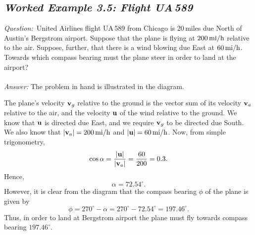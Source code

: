 \subsection*{\em Worked Example 3.5: Flight UA\,589}
{\em Question:}~United Airlines flight UA\,589 from Chicago is 20\,miles due
North of Austin's Bergstrom airport. Suppose that the plane is flying
at $200\,{\rm mi/h}$ relative to the air. Suppose, further, that there
is a wind blowing due East at $60\,{\rm mi/h}$. Towards which compass bearing must
the plane steer in order to land at the airport?\\
~\\
{\em Answer:} The problem in hand is illustrated in the diagram.
\begin{figure*}[h]
\epsfysize=2in
\centerline{}
\end{figure*}
The plane's velocity ${\bf v}_g$ relative to the ground is the
vector sum of its velocity ${\bf v}_a$ relative to the air, and the
velocity ${\bf u}$ of the wind relative to the ground. We know that
${\bf u}$ is directed due East, and we require ${\bf v}_g$ to be directed
due South. We also know that $|{\bf v}_a|=200\,{\rm mi/h}$ and $|{\bf u}|  = 60\,{\rm mi/h}$.
Now, from simple trigonometry, 
$$
\cos\alpha = \frac{|{\bf u}|}{|{\bf v}_a|} = \frac{60}{200} =0.3.
$$
Hence,
$$
\alpha = 72.54^\circ.
$$
However, it is clear from the diagram that the compass bearing $\phi$ of the
plane is given by
$$
\phi = 270^\circ -\alpha = 270^\circ -  72.54^\circ = 197.46^\circ.
$$
Thus, in order to land at Bergstrom airport the plane must fly towards compass
bearing $197.46^\circ$.
